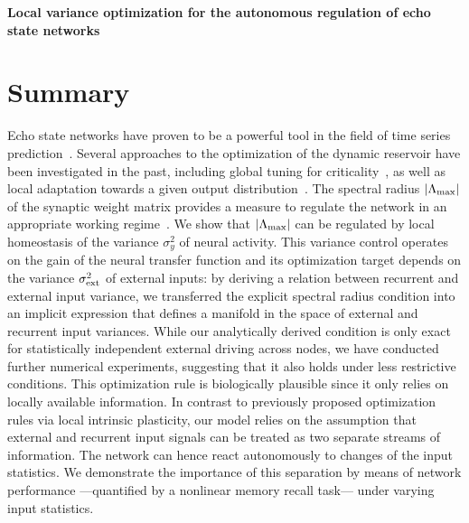 \documentclass[a4paper,12pt]{article}
\begin{document}
\pagestyle{empty}
\begin{center}
  \Large{\textbf{Local variance optimization for the autonomous regulation of echo state networks}}
\end{center}
\vspace{-.08cm}

\section{Summary}
Echo state networks have proven to be a powerful tool in the field of time series prediction~\citep{Jaeger_2001,Lukosevicius_2009}. Several approaches to the optimization of the dynamic reservoir have been investigated in the past, including global tuning for criticality~\citep{Livi_2016}, as well as local adaptation towards a given output distribution~\citep{Schrauwen_2008,Boedecker_2009}. The spectral radius $|\Lambda_{\rm max}|$ of the synaptic weight matrix provides a measure to regulate the network in an appropriate working regime~\citep{Caluwaerts_2013}. We show that $|\Lambda_{\rm max}|$ can be regulated by local homeostasis of the variance $\sigma_y^2$ of neural activity. This variance control operates on the gain of the neural transfer function and its optimization target depends on the variance $\sigma_{\rm ext}^2$ of external inputs: by deriving a relation between recurrent and external input variance, we transferred the explicit spectral radius condition into an implicit expression that defines a manifold in the space of external and recurrent input variances. While our analytically derived condition is only exact for statistically independent external driving across nodes, we have conducted further numerical experiments, suggesting that it also holds under less restrictive conditions. This optimization rule is biologically plausible since it only relies on locally available information. In contrast to previously proposed optimization rules via local intrinsic plasticity, our model relies on the assumption that external and recurrent input signals can be treated as two separate streams of information. The network can hence react autonomously to changes of the input statistics. We demonstrate the importance of this separation by means of network performance ---quantified by a nonlinear memory recall task--- under varying input statistics.
\vspace*{-5pt}
\end{document}
